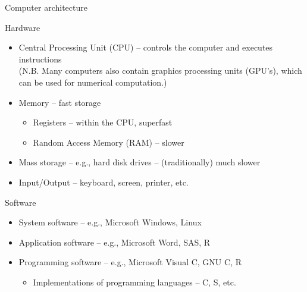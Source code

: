 \documentclass[ignorenonframetext,]{beamer}
\providecommand{\tightlist}{%
  \setlength{\itemsep}{0pt}\setlength{\parskip}{0pt}}
\begin{document}
\begin{frame}{Computer architecture}

Hardware

\begin{itemize}[<+->]
\tightlist
\item
  Central Processing Unit (CPU) -- controls the computer and executes
  instructions\\
  (N.B. Many computers also contain graphics processing units (GPU's),
  which can be used for numerical computation.)
\item
  Memory -- fast storage

  \begin{itemize}[<+->]
  \tightlist
  \item
    Registers -- within the CPU, superfast
  \item
    Random Access Memory (RAM) -- slower
  \end{itemize}
\item
  Mass storage -- e.g., hard disk drives -- (traditionally) much slower
\item
  Input/Output -- keyboard, screen, printer, etc.
\end{itemize}

\end{frame}

\begin{frame}

Software

\begin{itemize}[<+->]
\tightlist
\item
  System software -- e.g., Microsoft Windows, Linux
\item
  Application software -- e.g., Microsoft Word, SAS, R
\item
  Programming software -- e.g., Microsoft Visual C, GNU C, R

  \begin{itemize}[<+->]
  \tightlist
  \item
    Implementations of programming languages -- C, S, etc.
  \end{itemize}
\end{itemize}

\end{frame}
\end{document}

